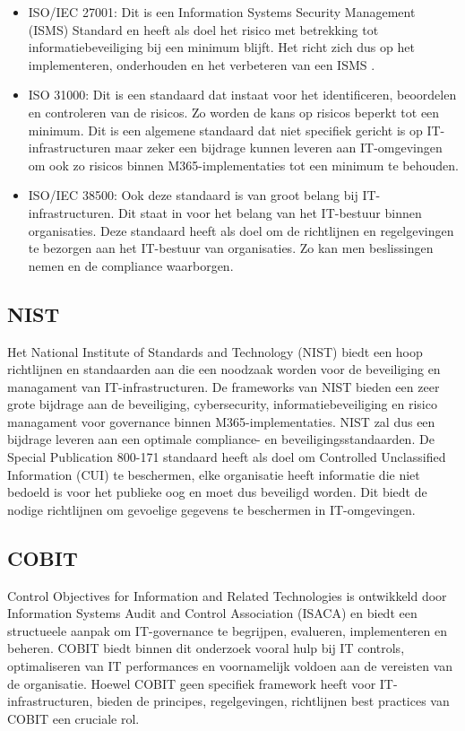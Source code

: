 \begin{itemize}
  \item ISO/IEC 27001:
  Dit is een Information Systems Security Management (ISMS) Standard en heeft als doel het risico met betrekking tot informatiebeveiliging bij een minimum blijft. Het richt zich dus op het implementeren, onderhouden en het verbeteren van een ISMS \autocite{VladisLavV.2008}.
  \item ISO 31000:
  Dit is een standaard dat instaat voor het identificeren, beoordelen en controleren van de risicos. Zo worden de kans op risicos beperkt tot een minimum.
  Dit is een algemene standaard dat niet specifiek gericht is op IT-infrastructuren maar zeker een bijdrage kunnen leveren aan IT-omgevingen om ook zo risicos binnen M365-implementaties tot een minimum te behouden.
  \item ISO/IEC 38500:
  Ook deze standaard is van groot belang bij IT-infrastructuren. Dit staat in voor het belang van het IT-bestuur binnen organisaties. Deze standaard heeft als doel om de richtlijnen en regelgevingen te bezorgen aan het IT-bestuur van organisaties. Zo kan men beslissingen nemen en de compliance waarborgen.

\end{itemize}

\subsection{NIST}
Het National Institute of Standards and Technology (NIST) biedt een hoop richtlijnen en standaarden aan die een noodzaak worden voor de beveiliging en managament van IT-infrastructuren. De frameworks van NIST bieden een zeer grote bijdrage aan de beveiliging, cybersecurity, informatiebeveiliging en risico managament voor governance binnen M365-implementaties.
NIST zal dus een bijdrage leveren aan een optimale compliance- en beveiligingsstandaarden.
De Special Publication 800-171 standaard heeft als doel om Controlled Unclassified Information (CUI) te beschermen, elke organisatie heeft informatie die niet bedoeld is voor het publieke oog en moet dus beveiligd worden. Dit biedt de nodige richtlijnen om gevoelige gegevens te beschermen in IT-omgevingen.

\subsection{COBIT}
Control Objectives for Information and Related Technologies is ontwikkeld door Information Systems Audit and Control Association (ISACA) en biedt een structueele aanpak om IT-governance te begrijpen, evalueren, implementeren en beheren. COBIT biedt binnen dit onderzoek vooral hulp bij IT controls, optimaliseren van IT performances en voornamelijk voldoen aan de vereisten van de organisatie.
Hoewel COBIT geen specifiek framework heeft voor IT-infrastructuren, bieden de principes, regelgevingen, richtlijnen best practices van COBIT een cruciale rol. 

